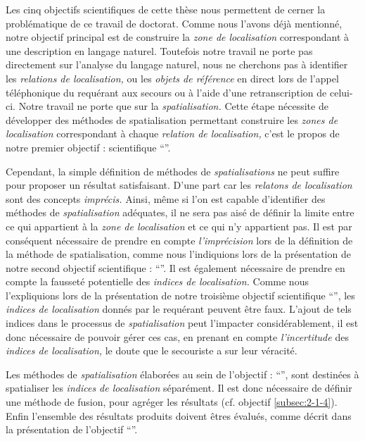 Les cinq objectifs scientifiques de cette thèse nous permettent de
cerner la problématique de ce travail de doctorat. Comme nous l'avons
déjà mentionné, notre objectif principal est de construire la
\emph{zone de localisation} correspondant à une description en langage
naturel. Toutefois notre travail ne porte pas directement sur
l'analyse du langage naturel, nous ne cherchons pas à identifier les
\emph{relations de localisation,} ou les \emph{objets de référence} en
direct lors de l'appel téléphonique du requérant aux secours ou à
l'aide d'une retranscription de celui-ci. Notre travail ne porte que
sur la \emph{spatialisation.} Cette étape nécessite de développer des
méthodes de spatialisation permettant construire les \emph{zones de
  localisation} correspondant à chaque \emph{relation de
  localisation,} c'est le propos de notre premier objectif :
scientifique \enquote{}.

Cependant, la simple définition de méthodes de \emph{spatialisations}
ne peut suffire pour proposer un résultat satisfaisant. D'une part car
les \emph{relatons de localisation} sont des concepts \emph{imprécis.}
Ainsi, même si l'on est capable d'identifier des méthodes de
\emph{spatialisation} adéquates, il ne sera pas aisé de définir la
limite entre ce qui appartient à la \emph{zone de localisation} et ce
qui n'y appartient pas. Il est par conséquent nécessaire de prendre en
compte \emph{l'imprécision} lors de la définition de la méthode de
spatialisation, comme nous l'indiquions lors de la présentation de
notre second objectif scientifique :
\enquote{}. Il est également nécessaire de
prendre en compte la fausseté potentielle des \emph{indices de
  localisation.} Comme nous l'expliquions lors de la présentation de
notre troisième objectif scientifique
\enquote{}, les \emph{indices de localisation}
donnés par le requérant peuvent être faux. L'ajout de tels indices
dans le processus de \emph{spatialisation} peut l'impacter
considérablement, il est donc nécessaire de pouvoir gérer ces cas, en
prenant en compte \emph{l'incertitude} des \emph{indices de
  localisation,} \ie le doute que le secouriste a sur leur véracité.

Les méthodes de \emph{spatialisation} élaborées au sein de l'objectif
: \enquote{}, sont destinées à spatialiser les
\emph{indices de localisation} séparément. Il est donc nécessaire de
définir une méthode de fusion, pour agréger les résultats
(cf. objectif \ref{subsec:2-1-4}). Enfin l'ensemble des résultats
produits doivent êtres évalués, comme décrit dans la présentation de
l'objectif \enquote{}.

